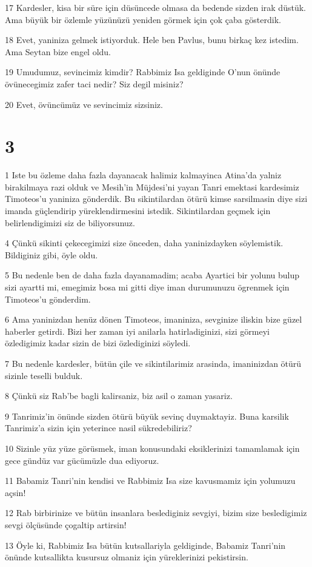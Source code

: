 \par 17 Kardesler, kisa bir süre için düsüncede olmasa da bedende sizden irak düstük. Ama büyük bir özlemle yüzünüzü yeniden görmek için çok çaba gösterdik.
\par 18 Evet, yaniniza gelmek istiyorduk. Hele ben Pavlus, bunu birkaç kez istedim. Ama Seytan bize engel oldu.
\par 19 Umudumuz, sevincimiz kimdir? Rabbimiz Isa geldiginde O'nun önünde övünecegimiz zafer taci nedir? Siz degil misiniz?
\par 20 Evet, övüncümüz ve sevincimiz sizsiniz.

\chapter{3}

\par 1 Iste bu özleme daha fazla dayanacak halimiz kalmayinca Atina'da yalniz birakilmaya razi olduk ve Mesih'in Müjdesi'ni yayan Tanri emektasi kardesimiz Timoteos'u yaniniza gönderdik. Bu sikintilardan ötürü kimse sarsilmasin diye sizi imanda güçlendirip yüreklendirmesini istedik. Sikintilardan geçmek için belirlendigimizi siz de biliyorsunuz.
\par 4 Çünkü sikinti çekecegimizi size önceden, daha yaninizdayken söylemistik. Bildiginiz gibi, öyle oldu.
\par 5 Bu nedenle ben de daha fazla dayanamadim; acaba Ayartici bir yolunu bulup sizi ayartti mi, emegimiz bosa mi gitti diye iman durumunuzu ögrenmek için Timoteos'u gönderdim.
\par 6 Ama yaninizdan henüz dönen Timoteos, imaniniza, sevginize iliskin bize güzel haberler getirdi. Bizi her zaman iyi anilarla hatirladiginizi, sizi görmeyi özledigimiz kadar sizin de bizi özlediginizi söyledi.
\par 7 Bu nedenle kardesler, bütün çile ve sikintilarimiz arasinda, imaninizdan ötürü sizinle teselli bulduk.
\par 8 Çünkü siz Rab'be bagli kalirsaniz, biz asil o zaman yasariz.
\par 9 Tanrimiz'in önünde sizden ötürü büyük sevinç duymaktayiz. Buna karsilik Tanrimiz'a sizin için yeterince nasil sükredebiliriz?
\par 10 Sizinle yüz yüze görüsmek, iman konusundaki eksiklerinizi tamamlamak için gece gündüz var gücümüzle dua ediyoruz.
\par 11 Babamiz Tanri'nin kendisi ve Rabbimiz Isa size kavusmamiz için yolumuzu açsin!
\par 12 Rab birbirinize ve bütün insanlara beslediginiz sevgiyi, bizim size besledigimiz sevgi ölçüsünde çogaltip artirsin!
\par 13 Öyle ki, Rabbimiz Isa bütün kutsallariyla geldiginde, Babamiz Tanri'nin önünde kutsallikta kusursuz olmaniz için yüreklerinizi pekistirsin.

